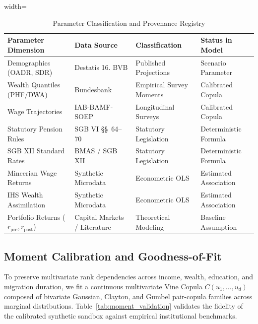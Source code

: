 \documentclass[conference]{IEEEtran}
\begin{document}
\begin{table}[htbp]
\caption{Parameter Classification and Provenance Registry}
\centering
\begin{adjustbox}{width=\columnwidth}
\begin{tabular}{llll}
\toprule
\textbf{Parameter Dimension} & \textbf{Data Source} & \textbf{Classification} & \textbf{Status in Model} \\
\midrule
Demographics (OADR, SDR) & Destatis 16. BVB \cite{destatis2024bvb} & Published Projections & Scenario Parameter \\
Wealth Quantiles (PHF/DWA) & Bundesbank \cite{bundesbank2024dwa, bundesbank2023phf} & Empirical Survey Moments & Calibrated Copula \\
Wage Trajectories & IAB-BAMF-SOEP \cite{iab2025refugees, kosyakova2024simulation} & Longitudinal Surveys & Calibrated Copula \\
Statutory Pension Rules & SGB VI \S\S~64--70 \cite{drv2025rentenatlas} & Statutory Legislation & Deterministic Formula \\
SGB XII Standard Rates & BMAS / SGB XII \cite{bmas2026sgbxii} & Statutory Legislation & Deterministic Formula \\
Mincerian Wage Returns & Synthetic Microdata & Econometric OLS & Estimated Association \\
IHS Wealth Assimilation & Synthetic Microdata & Econometric OLS & Estimated Association \\
Portfolio Returns ($r_{\text{pre}}, r_{\text{post}}$) & Capital Markets / Literature & Theoretical Modeling & Baseline Assumption \\
\bottomrule
\end{tabular}
\end{adjustbox}
\label{tab:provenance}
\end{table}

\subsection{Moment Calibration and Goodness-of-Fit}
To preserve multivariate rank dependencies across income, wealth, education, and migration duration, we fit a continuous multivariate Vine Copula $C(u_1, \dots, u_d)$ composed of bivariate Gaussian, Clayton, and Gumbel pair-copula families across marginal distributions. Table~\ref{tab:moment_validation} validates the fidelity of the calibrated synthetic sandbox against empirical institutional benchmarks.
\end{document}
